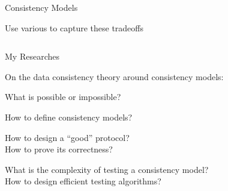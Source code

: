 \begin{frame}{Consistency Models}
	\begin{center}
		Use various  to capture these tradeoffs
	\end{center}

	\begin{columns}[c]
		\begin{center}
		\end{center}
		\begin{center}
		\end{center}
	\end{columns}

	\pause
\end{frame}

\begin{frame}{My Researches}
	\begin{center}
		On the data consistency theory around consistency models:
	\end{center}

	\pause
	\begin{description}[<+->]
		\setlength{\itemsep}{8pt}
		\item[Computability:] What is possible or impossible?
		\item[Specification:] How to define consistency models?
		\item[Protocol:] How to design a ``good'' protocol? \\[3pt]
			How to prove its correctness?
		\item[Testing:] What is the complexity of testing a consistency model? \\[3pt]
			How to design efficient testing algorithms?
	\end{description}

\end{frame}

